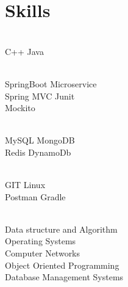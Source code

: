 \documentclass[]{deedy-resume-openfont}
\begin{document}
\begin{minipage}[t]{0.33\textwidth}

\section{Skills}
\sectionsep
{}\\
\textbullet{} C++ \textbullet{} Java 
   
\sectionsep

\\
 \textbullet{} SpringBoot 
  \textbullet{} Microservice \\
 \textbullet{} Spring MVC
 \textbullet{} Junit\\
 \textbullet{} Mockito \\
 \sectionsep


\\
 \textbullet{} MySQL 
\textbullet{} MongoDB \\
\textbullet{} Redis
\textbullet{} DynamoDb
\sectionsep


\\
\textbullet{} GIT \textbullet{}Linux \\
\textbullet{}Postman \textbullet{} Gradle


\sectionsep


\\

\textbullet{}Data structure and Algorithm  \\
\textbullet{}Operating Systems\\
\textbullet{}Computer Networks\\
\textbullet{}Object Oriented Programming\\
\textbullet{}Database Management Systems \\
\sectionsep



\end{minipage}
\end{document}
